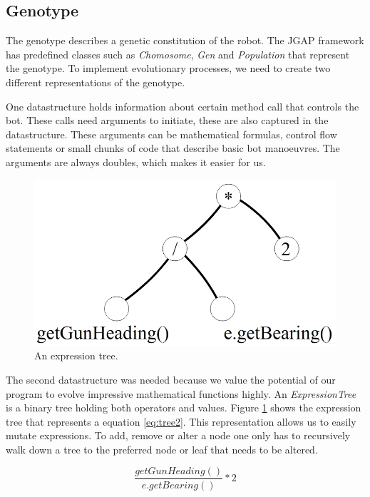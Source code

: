 \documentclass[a4paper,10pt]{article}
\begin{document}
\subsection{Genotype}
The genotype describes a genetic constitution of the robot. The JGAP framework has predefined classes such as \textit{Chomosome}, \textit{Gen} and \textit{Population} that represent the genotype.
To implement evolutionary processes, we need to create two different representations of the genotype.

One datastructure holds information about certain method call that controls the bot.
These calls need arguments to initiate, these are also captured in the datastructure. These arguments can be mathematical formulas, control flow statements or small chunks of code that describe basic bot manoeuvres. The arguments are always doubles, which makes it easier for us.

\begin{figure}
    \centering
    \includegraphics[scale=0.2]{tree}
    \caption{An expression tree.}
    \label{fig:tree1}
\end{figure}     

The second datastructure was needed because we value the potential of our program to evolve impressive 
mathematical functions highly. An \textit{ExpressionTree} is a binary tree holding both operators and 
values. Figure \ref{fig:tree1} shows the expression tree that represents a equation \ref{eq:tree2}. 
This representation allows us to easily mutate expressions. To add, remove or alter a node 
one only has to recursively walk down a tree to the preferred node or leaf that needs to be altered.  

\begin{equation}
    \frac{getGunHeading()}{e.getBearing()}*2
    \label{eq:tree2}
\end{equation}
\end{document}
